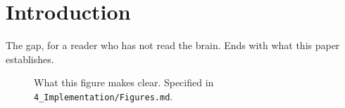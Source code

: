 \section{Introduction}
\label{sec:introduction}

The gap, for a reader who has not read the brain. Ends with what this paper establishes.

\begin{figure}[t]
  \centering
  \caption{What this figure makes clear. Specified in \texttt{4\_Implementation/Figures.md}.}
  \label{fig:overview}
\end{figure}
